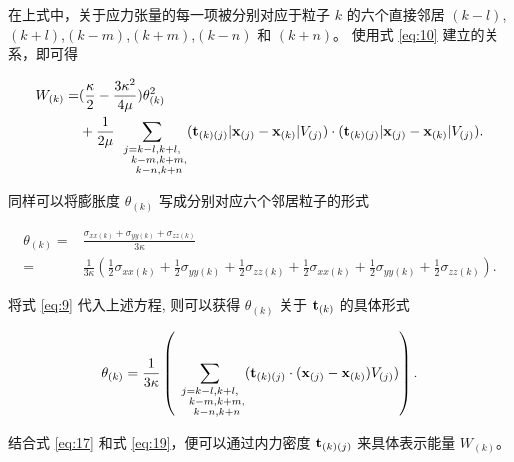 {在上式中，关于应力张量的每一项被分别对应于粒子 $k$ 的六个直接邻居 $(k-l)$,$(k+l)$,$(k-m)$,$(k+m)$,$(k-n)$ 和 $(k+n)$。 使用式 \ref{eq:10} 建立的关系，即可得

\begin{equation}
\begin{aligned}
W_{(k)} =& (\frac{\kappa}{2} -\frac{3\kappa^2}{4\mu})\theta_{(k)}^2 \\
         &+\frac{1}{2\mu}\sum_{\substack {j=k-l,k+l,\\ \quad k-m,k+m,\\ \quad k-n,k+n}}(\mathbf{t}_{(k)(j)}|\mathbf{x}_{(j)}-\mathbf{x}_{(k)}|V_{(j)})\cdot(\mathbf{t}_{(k)(j)}|\mathbf{x}_{(j)}-\mathbf{x}_{(k)}|V_{(j)}).
\end{aligned}
\label{eq:17}
\end{equation}

同样可以将膨胀度 $\theta_{(k)}$ 写成分别对应六个邻居粒子的形式

\begin{equation}
\begin{aligned}
\theta_{(k)} =& \frac{\sigma_{xx(k)}+\sigma_{yy(k)}+\sigma_{zz(k)}}{3\kappa}\\
        =& \frac{1}{3\kappa}(\frac{1}{2}\sigma_{xx(k)}+\frac{1}{2}\sigma_{yy(k)}+\frac{1}{2}\sigma_{zz(k)}
         + \frac{1}{2}\sigma_{xx(k)}+\frac{1}{2}\sigma_{yy(k)}+\frac{1}{2}\sigma_{zz(k)}).
\end{aligned}
\label{eq:18}
\end{equation}

将式 \ref{eq:9} 代入上述方程, 则可以获得 $\theta_{(k)}$ 关于 $\mathbf{t}_{(k)}$ 的具体形式

\begin{equation}
\theta_{(k)} = \frac{1}{3\kappa}\left(\sum_{\substack {j=k-l,k+l,\\ \quad k-m,k+m,\\ \quad k-n,k+n}}(\mathbf{t}_{(k)(j)}\cdot(\mathbf{x}_{(j)}-\mathbf{x}_{(k)})V_{(j)})\right).
\label{eq:19}
\end{equation}

结合式 \ref{eq:17} 和式 \ref{eq:19}，便可以通过内力密度 $\mathbf{t}_{(k)(j)}$ 来具体表示能量 $W_{(k)}$。

}
